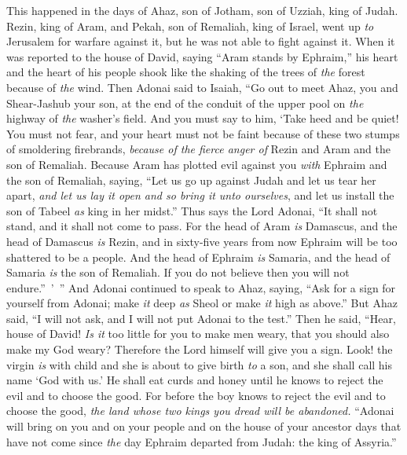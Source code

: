 \begin{biblechapter} %
 This happened in the days of Ahaz, son of Jotham, son of Uzziah, king of Judah. Rezin, king of Aram, and Pekah, son of Remaliah, king of Israel, went up \textit{to} Jerusalem for warfare against it, but he was not able to fight against it.
\verse When it was reported to the house of David, saying “Aram stands by Ephraim,” his heart and the heart of his people shook like the shaking of the trees of \textit{the} forest because of \textit{the} wind.
\verse Then Adonai said to Isaiah, “Go out to meet Ahaz, you and Shear-Jashub your son, at the end of the conduit of the upper pool on \textit{the} highway of \textit{the} washer’s field.
\verse And you must say to him, ‘Take heed and be quiet! You must not fear, and your heart must not be faint because of these two stumps of smoldering firebrands, \textit{because of the fierce anger of} Rezin and Aram and the son of Remaliah.
\verse Because Aram has plotted evil against you \textit{with} Ephraim and the son of Remaliah, saying,
\verse “Let us go up against Judah and let us tear her apart, \textit{and let us lay it open and so bring it unto ourselves}, and let us install the son of Tabeel \textit{as} king in her midst.”
\verse Thus says the Lord Adonai, “It shall not stand, and it shall not come to pass.
\verse For the head of Aram \textit{is} Damascus, and the head of Damascus \textit{is} Rezin, and in sixty-five years from now Ephraim will be too shattered to be a people.
\verse And the head of Ephraim \textit{is} Samaria, and the head of Samaria \textit{is} the son of Remaliah. If you do not believe then you will not endure.” ’ ”
\verse And Adonai continued to speak to Ahaz, saying,
\verse “Ask for a sign for yourself from Adonai; make \textit{it} deep \textit{as} Sheol or make \textit{it} high as above.”
\verse But Ahaz said, “I will not ask, and I will not put Adonai to the test.”
\verse Then he said, “Hear, house of David! \textit{Is it} too little for you to make men weary, that you should also make my God weary?
\verse Therefore the Lord himself will give you a sign. Look! the virgin \textit{is} with child and she is about to give birth \textit{to} a son, and she shall call his name ‘God with us.’
\verse He shall eat curds and honey until he knows to reject the evil and to choose the good.
\verse For before the boy knows to reject the evil and to choose the good, \textit{the land whose two kings you dread will be abandoned.}
 “Adonai will bring on you and on your people and on the house of your ancestor days that have not come since \textit{the} day Ephraim departed from Judah: the king of Assyria.”

\end{biblechapter}
